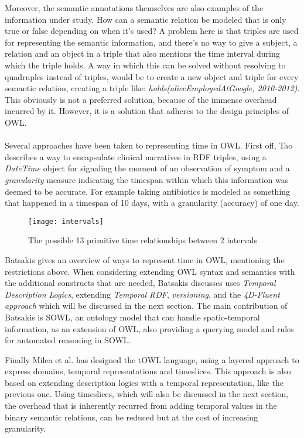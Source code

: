\documentclass{llncs}
\begin{document}
Moreover, the semantic annotations themselves are also examples of the information under study. How can a semantic relation be modeled that is only true or false depending on when it's used? A problem here is that triples are used for representing the semantic information, and there's no way to give a subject, a relation and an object in a triple that also mentions the time interval during which the triple holds.\cite{Welty2006} A way in which this can be solved without resolving to quadruples instead of triples, would be to create a new object and triple for every semantic relation, creating a triple like: \emph{holds(aliceEmployedAtGoogle, 2010-2012)}. This obviously is not a preferred solution, because of the immense overhead incurred by it. However, it is a solution that adheres to the design principles of OWL.\\
\\
Several approaches have been taken to representing time in OWL. First off, Tao describes a way to encapsulate clinical narratives in RDF triples, using a \emph{DateTime} object for signaling the moment of an observation of symptom and a \emph{granularity} measure indicating the timespan within which this information was deemed to be accurate.\cite{Tao2010} For example taking antibiotics is modeled as something that happened in a timespan of 10 days, with a granularity (accuracy) of one day.

\begin{figure}[top]
\texttt{[image: intervals]}
\caption{The possible 13 primitive time relationships between 2 intervals \cite{Pinhanez1997}}
\label{fig:intervals}
\end{figure}

Batsakis gives an overview of ways to represent time in OWL, mentioning the restrictions above.\cite{Batsakis2010} When considering extending OWL syntax and semantics with the additional constructs that are needed, Batsakis discusses uses \emph{Temporal Description Logics}, extending \emph{Temporal RDF}, \emph{versioning}, and the \emph{4D-Fluent approach} which will be discussed in the next section. The main contribution of Batsakis is SOWL, an ontology model that can handle spatio-temporal information, as an extension of OWL, also providing a querying model and rules for automated reasoning in SOWL.

Finally Milea et al. has designed the tOWL language, using a layered approach to express domains, temporal representations and timeslices.\cite{Milea2008}\cite{Milea2012} This approach is also based on extending description logics with a temporal representation, like the previous one. Using timeslices, which will also be discussed in the next section, the overhead that is inherently recurred from adding temporal values in the binary semantic relations, can be reduced but at the cost of increasing granularity.
\end{document}
